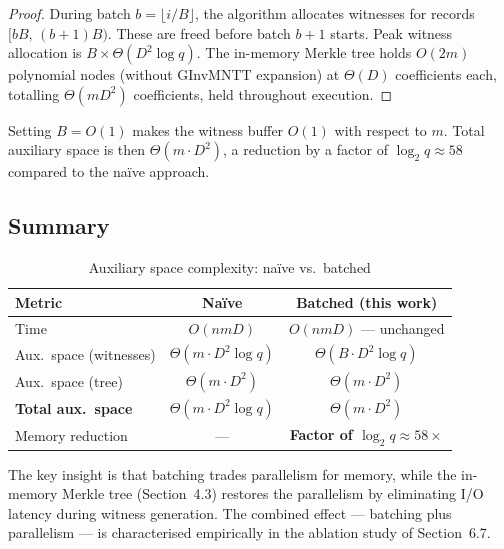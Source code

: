 \begin{proof}
During batch $b = \lfloor i/B \rfloor$, the algorithm allocates witnesses for
records $[bB,\, (b+1)B)$. These are freed before batch $b+1$ starts. Peak
witness allocation is $B \times \Theta(D^2 \log q)$. The in-memory Merkle tree holds $O(2m)$
polynomial nodes (without GInvMNTT expansion) at $\Theta(D)$ coefficients each,
totalling $\Theta(mD^2)$ coefficients, held throughout execution.
\end{proof}

\begin{corollary}\label{cor:batch-reduction}
Setting $B = O(1)$ makes the witness buffer $O(1)$ with respect to $m$.
Total auxiliary space is then $\Theta(m \cdot D^2)$, a reduction by
a factor of $\log_2 q \approx 58$ compared to the na\"{i}ve approach.
\end{corollary}

\subsection{Summary}

\begin{table}[H]
\centering
\caption{Auxiliary space complexity: naïve vs.\ batched}
\label{tab:complexity-summary}
\begin{tabular}{@{}lcc@{}}
\toprule
\textbf{Metric} & \textbf{Naïve} & \textbf{Batched (this work)} \\
\midrule
Time              & $O(nmD)$                       & \textbf{$O(nmD)$} --- unchanged \\
Aux.\ space (witnesses) & $\Theta(m \cdot D^2 \log q)$   & \textbf{$\Theta(B \cdot D^2 \log q)$} \\
Aux.\ space (tree)      & $\Theta(m \cdot D^2)$          & \textbf{$\Theta(m \cdot D^2)$} \\
\textbf{Total aux.\ space}& $\Theta(m \cdot D^2 \log q)$   & \textbf{$\Theta(m \cdot D^2)$} \\
Memory reduction  & ---                            & \textbf{Factor of $\log_2 q \approx 58\times$} \\
\bottomrule
\end{tabular}
\end{table}

The key insight is that batching trades parallelism for memory, while the in-memory
Merkle tree (Section~4.3) restores the parallelism by eliminating I/O latency during
witness generation. The combined effect --- batching plus parallelism --- is characterised
empirically in the ablation study of Section~6.7.

\clearpage
